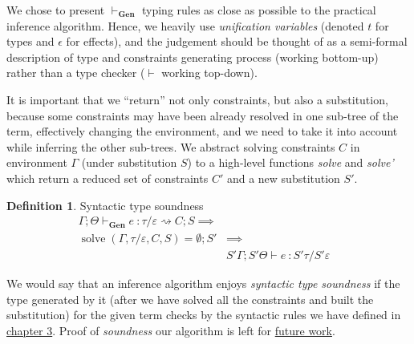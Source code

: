 \documentclass[declaration,shortabstract]{iithesis}
\theoremstyle{definition} \newtheorem{definition}{Definition}[section]
\newcommand{\types}[4][\Gamma;\Theta]{\ensuremath{{{#1} \vdash {#2} \: : {#3}/{#4}}}}
\newcommand{\gens}[6][\Gamma;\Theta]{\ensuremath{{{#1} \vdash_\textbf{Gen} {#2} \: : {#3}/{#4}} \rightsquigarrow {#5};{#6}}}
\begin{document}
We chose to present  $\vdash_\textbf{Gen}$ typing rules as close as possible
to the practical inference algorithm.
Hence, we heavily use \textit{unification variables}
(denoted $t$ for types and $\epsilon$ for effects),
and the judgement should be thought of as a semi-formal description of
type and constraints generating process (working bottom-up) rather than
a type checker ($\vdash$ working top-down).

It is important that we ``return'' not only constraints, but also a substitution, 
because some constraints may have been already resolved in
one sub-tree of the term, effectively changing the environment,
and we need to take it into account while inferring the other sub-trees.
We abstract solving constraints $C$ in environment $\Gamma$ (under substitution $S$) to
a high-level functions \textit{solve} and \textit{solve'} which return a reduced set of constraints $C'$ and
a new substitution $S'$. 
\theoremstyle{definition} 
\begin{definition}{Syntactic type soundness}
   $$
   \begin{aligned}
    \gens{e}{\tau}{\varepsilon}{C}{S} \implies& &\\
    \operatorname{solve}(\Gamma,\tau/\varepsilon, C, S) = \emptyset; S' & \implies & \\
      &\types[S'\Gamma;S'\Theta]{e}{S'\tau}{S'\varepsilon} &
    \end{aligned}
    $$
\end{definition}
We would say that an inference algorithm enjoys \textit{syntactic type soundness}
if the type generated by it (after we have solved all the constraints and built the substitution)
for the given term checks by the syntactic rules we have defined in \hyperlink{chapter.3}{chapter 3}.
Proof of \textit{soundness} our algorithm is left for \hyperlink{chapter.6}{future work}.

\setlength{\jot}{12pt}
\end{document}
